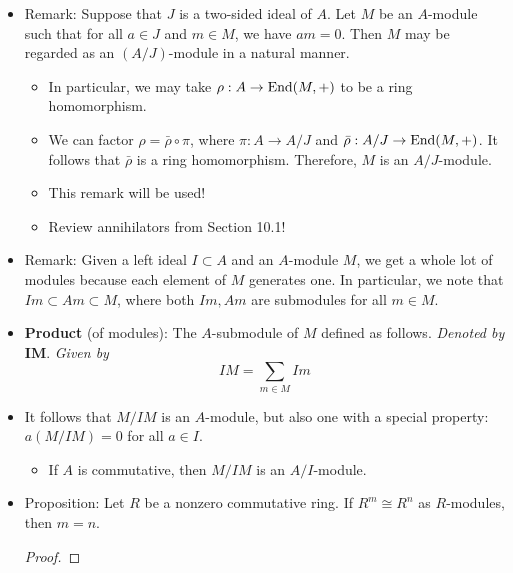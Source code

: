 \documentclass[../notes.tex]{subfiles}
\begin{document}
\begin{itemize}
\begin{proof}
        Consider $R$ as an $R$-module. Then $R=(1)$ is finitely generated. This combined with the fact that it is nonzero by hypothesis allows us to invoke the above proposition, learning that $R$ has a maximal submodule $N$. But by the observation from Lecture 6.1, $N$ is a left ideal, which is equivalent to a two-sided ideal in a commutative ring. Maximality transfers over as well (as we can confirm), proving that $N$ is the desired maximal ideal of $R$.
    \end{proof}
    \item Remark: Suppose that $J$ is a two-sided ideal of $A$. Let $M$ be an $A$-module such that for all $a\in J$ and $m\in M$, we have $am=0$. Then $M$ may be regarded as an $(A/J)$-module in a natural manner.
    \begin{itemize}
        \item In particular, we may take $\rho:A\to\operatorname{End}(M,+)$ to be a ring homomorphism.
        \item We can factor $\rho=\bar{\rho}\circ\pi$, where $\pi:A\to A/J$ and $\bar{\rho}:A/J\to\operatorname{End}(M,+)$. It follows that $\bar{\rho}$ is a ring homomorphism. Therefore, $M$ is an $A/J$-module.
        \item This remark will be used!
        \item Review annihilators from Section 10.1!
    \end{itemize}
    \item Remark: Given a left ideal $I\subset A$ and an $A$-module $M$, we get a whole lot of modules because each element of $M$ generates one. In particular, we note that $Im\subset Am\subset M$, where both $Im,Am$ are submodules for all $m\in M$.
    \item \textbf{Product} (of modules): The $A$-submodule of $M$ defined as follows. \emph{Denoted by} $\bm{IM}$. \emph{Given by}
    \begin{equation*}
        IM = \sum_{m\in M}Im
    \end{equation*}
    \item It follows that $M/IM$ is an $A$-module, but also one with a special property: $a(M/IM)=0$ for all $a\in I$.
    \begin{itemize}
        \item If $A$ is commutative, then $M/IM$ is an $A/I$-module.
    \end{itemize}
    \item Proposition: Let $R$ be a nonzero commutative ring. If $R^m\cong R^n$ as $R$-modules, then $m=n$.
    \begin{proof}

\end{proof}
\end{itemize}
\end{document}
